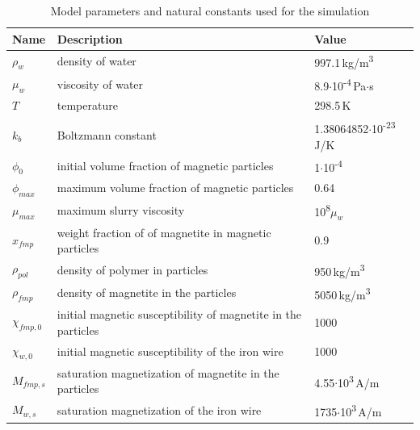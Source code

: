 \begin{table}[h]
\centering
\caption[Model parameters]{Model parameters and natural constants used for the simulation}
\label{table:param_mod}
\begin{tabularx}{\textwidth}{XXX}\hline
Name & Description & Value \\
\hline\hline
$\rho_{w}$ & density of water &  997.1\,kg/m\textsuperscript{3}\\
$\mu_{w}$ & viscosity of water & 8.9$\cdotp$10\textsuperscript{-4}\,Pa$\cdotp$s\\
$T$ & temperature & 298.5\,K\\
$k_{b}$ & Boltzmann constant & 1.38064852$\cdotp$10\textsuperscript{-23}\,J/K\\
$\phi_{0}$ & initial volume fraction of magnetic particles & 1$\cdotp$10\textsuperscript{-4}\\
$\phi_{max}$ & maximum volume fraction of magnetic particles & 0.64\\
$\mu_{max}$ & maximum slurry viscosity & 10\textsuperscript{8}$\mu_{w}$\\
$x_{fmp}$ & weight fraction of of magnetite in magnetic particles & 0.9\\
$\rho_{pol}$ & density of polymer in particles & 950\,kg/m\textsuperscript{3}\\
$\rho_{fmp}$ & density of magnetite in the particles & 5050\,kg/m\textsuperscript{3}\\
$\chi_{fmp,0}$ & initial magnetic susceptibility of magnetite in the particles & 1000\\
$\chi_{w,0}$ & initial magnetic susceptibility of the iron wire & 1000\\
$M_{fmp,s}$ & saturation magnetization of magnetite in the particles & 4.55$\cdotp$10\textsuperscript{3}\,A/m\\
$M_{w,s}$ & saturation magnetization of the iron wire & 1735$\cdotp$10\textsuperscript{3}\,A/m\\
\hline
\end{tabularx}
\end{table}

